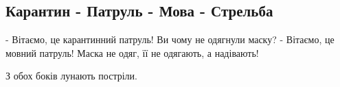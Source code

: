  
 
 
 
 

\subsection{Карантин - Патруль - Мова - Стрельба}

- Вітаємо, це карантинний патруль! Ви чому не одягнули маску?
- Вітаємо, це мовний патруль! Маска не одяг, її не одягають, а надівають!

З обох боків лунають постріли.

